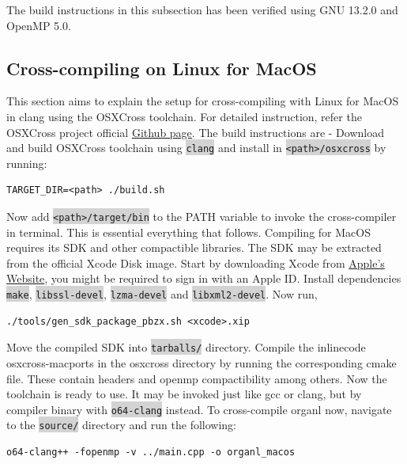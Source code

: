 \documentclass[11pt]{article}
\newcommand{\inlinecode}[1]{\colorbox{lightgray}{\lstinline[breaklines=true,basicstyle=\ttfamily]{#1}}}
\begin{document}
The build instructions in this subsection has been verified using GNU 13.2.0 and OpenMP 5.0.

\subsection{Cross-compiling on Linux for MacOS}
This section aims to explain the setup for cross-compiling with Linux for MacOS in clang using the OSXCross\cite{osxcross} toolchain. For detailed instruction, refer the OSXCross project official \href{https://github.com/tpoechtrager/osxcross?tab=readme-ov-file#how-does-it-work}{Github page}. The build instructions are  - 
Download and build OSXCross toolchain using \inlinecode{clang} and install in \inlinecode{<path>/osxcross} by running:
\begin{mdframed}[backgroundcolor=lightgray, linecolor=lightgray]
\begin{verbatim}
TARGET_DIR=<path> ./build.sh
\end{verbatim}
\end{mdframed}
Now add \inlinecode{<path>/target/bin} to the PATH variable to invoke the cross-compiler in terminal. This is essential everything that follows.
Compiling for MacOS requires its SDK and other compactible libraries. The SDK may be extracted from the official Xcode Disk image. Start by downloading Xcode from \href{https://developer.apple.com/download/all/}{Apple's Website}, you might be required to sign in with an Apple ID. Install dependencies \inlinecode{make}, \inlinecode{libssl-devel}, \inlinecode{lzma-devel} and \inlinecode{libxml2-devel}. Now run, 
\begin{mdframed}[backgroundcolor=lightgray, linecolor=lightgray]
\begin{verbatim}
./tools/gen_sdk_package_pbzx.sh <xcode>.xip
\end{verbatim}
\end{mdframed}
Move the compiled SDK into \inlinecode{tarballs/} directory. Compile the inlinecode{ osxcross-macports} in the osxcross directory by running the corresponding cmake file. These contain headers and openmp compactibility among others. Now the toolchain is ready to use. It may be invoked just like gcc or clang, but by compiler binary with \inlinecode{o64-clang} instead. To cross-compile organl now, navigate to the \inlinecode{source/} directory and run the following:
\begin{mdframed}[backgroundcolor=lightgray, linecolor=lightgray]
\begin{verbatim}
o64-clang++ -fopenmp -v ../main.cpp -o organl_macos
\end{verbatim}
\end{mdframed}
\end{document}
